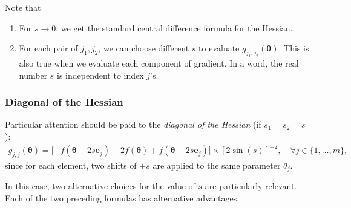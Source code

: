 Note that
\begin{enumerate}
    \item For $s \rightarrow 0$, we get the standard central difference formula for the Hessian.
    \item For each pair of $j_1,j_2$, we can choose different $s$ to evaluate $g_{j_1, j_2}(\boldsymbol{\theta})$. This is also true when we evaluate each component of gradient. In a word, the real number $s$ is independent to index $j$'s.
\end{enumerate}

\subsubsection{Diagonal of the Hessian}

Particular attention should be paid to the \textit{diagonal of the Hessian} (if $s_1=s_2=s$):
\begin{align}
g_{j, j}(\boldsymbol{\theta})=[ & f\left(\boldsymbol{\theta}+2s\mathbf{e}_{j}\right)
-2 f\left(\boldsymbol{\theta}\right) 
+ f\left(\boldsymbol{\theta}-2s\mathbf{e}_{j}\right)]
\times [2 \sin (s)]^{-2} , \quad \forall j \in \{1,\dots,m\},
\end{align}
since for each element, two shifts of $\pm s$ are applied to the same parameter $\theta_j$. 

In this case, two alternative choices for the value of $s$ are particularly relevant. Each of the two preceding formulas has alternative advantages.

